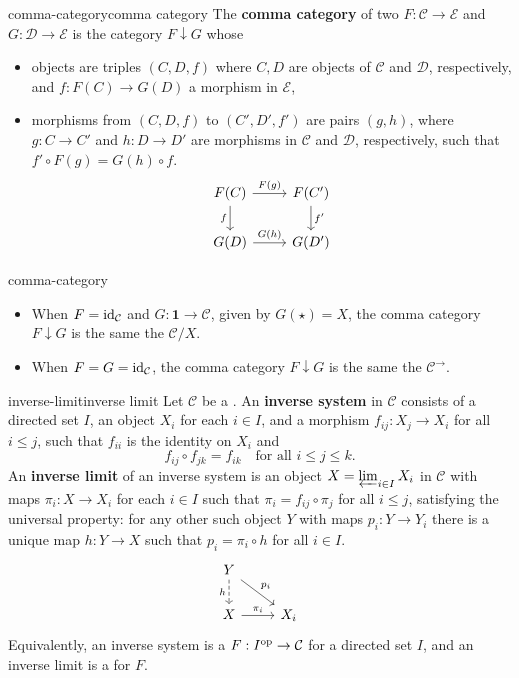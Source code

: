 \begin{topic}{comma-category}{comma category}
    The \textbf{comma category} of two  $F : \mathcal{C} \to \mathcal{E}$ and $G : \mathcal{D} \to \mathcal{E}$ is the category $F \downarrow G$ whose
    \begin{itemize}
        \item objects are triples $(C, D, f)$ where $C, D$ are objects of $\mathcal{C}$ and $\mathcal{D}$, respectively, and $f : F(C) \to G(D)$ a morphism in $\mathcal{E}$,
        \item morphisms from $(C, D, f)$ to $(C', D', f')$ are pairs $(g, h)$, where $g : C \to C'$ and $h : D \to D'$ are morphisms in $\mathcal{C}$ and $\mathcal{D}$, respectively, such that $f' \circ F(g) = G(h) \circ f$.
        \[ \begin{tikzcd}
            F(C) \arrow{r}{F(g)} \arrow[swap]{d}{f} & F(C') \arrow{d}{f'} \\ G(D) \arrow{r}{G(h)} & G(D')
        \end{tikzcd} \]
    \end{itemize}
\end{topic}

\begin{example}{comma-category}
    \begin{itemize}
        \item When $F = \textup{id}_\mathcal{C}$ and $G : \textbf{1} \to \mathcal{C}$, given by $G(\star) = X$, the comma category $F \downarrow G$ is the same the  $\mathcal{C}/X$.
        \item When $F = G = \textup{id}_\mathcal{C}$, the comma category $F \downarrow G$ is the same the  $\mathcal{C}^\rightarrow$.
    \end{itemize}
\end{example}

\begin{topic}{inverse-limit}{inverse limit}
    Let $\mathcal{C}$ be a . An \textbf{inverse system} in $\mathcal{C}$ consists of a directed set $I$, an object $X_i$ for each $i \in I$, and a morphism $f_{ij} : X_j \to X_i$ for all $i \le j$, such that $f_{ii}$ is the identity on $X_i$ and
    \[ f_{ij} \circ f_{jk} = f_{ik} \quad \text{for all } i \le j \le k . \]
    An \textbf{inverse limit} of an inverse system is an object $X = \varprojlim_{i \in I} X_i$ in $\mathcal{C}$ with maps $\pi_i : X \to X_i$ for each $i \in I$ such that $\pi_i = f_{ij} \circ \pi_j$ for all $i \le j$, satisfying the universal property: for any other such object $Y$ with maps $p_i : Y \to Y_i$ there is a unique map $h : Y \to X$ such that $p_i = \pi_i \circ h$ for all $i \in I$.
    \[ \begin{tikzcd} Y \arrow[dashed, swap]{d}{h} \arrow{dr}{p_i} & \\ X \arrow{r}{\pi_i} & X_i \end{tikzcd} \]
    Equivalently, an inverse system is a  $F : I^\textup{op} \to \mathcal{C}$ for a directed set $I$, and an inverse limit is a  for $F$.
\end{topic}

